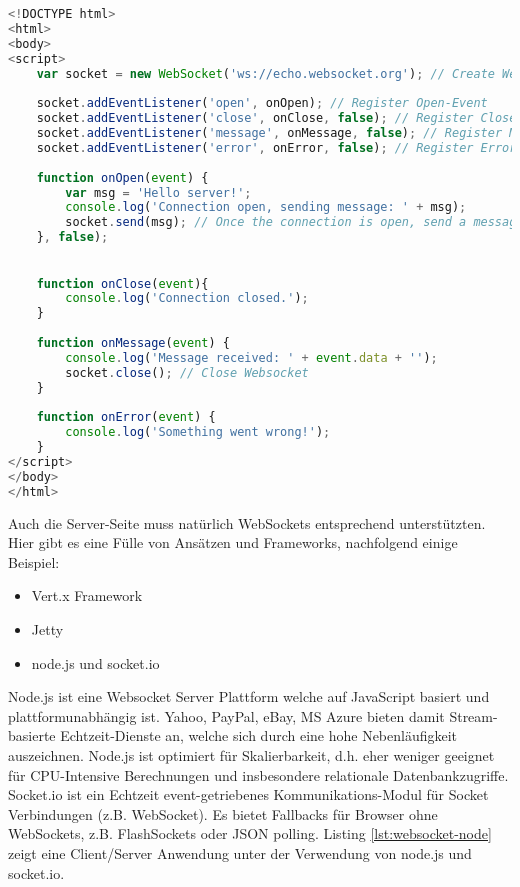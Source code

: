 \begin{lstlisting}[language=Javascript, caption=Websocket Client, label=lst:websocket-client]
<!DOCTYPE html>
<html>
<body>
<script>
	var socket = new WebSocket('ws://echo.websocket.org'); // Create Websocket
	
	socket.addEventListener('open', onOpen); // Register Open-Event
	socket.addEventListener('close', onClose, false); // Register Close-Event
	socket.addEventListener('message', onMessage, false); // Register Message-Event
	socket.addEventListener('error', onError, false); // Register Error-Event
	
	function onOpen(event) {
		var msg = 'Hello server!';
		console.log('Connection open, sending message: ' + msg);
		socket.send(msg); // Once the connection is open, send a message to the server
	}, false);
	

	function onClose(event){
		console.log('Connection closed.');
	}
	
	function onMessage(event) {
		console.log('Message received: ' + event.data + '');
		socket.close(); // Close Websocket
	}
	
	function onError(event) {
		console.log('Something went wrong!');
	}
</script>
</body>
</html>
\end{lstlisting}

Auch die Server-Seite muss natürlich WebSockets entsprechend unterstützten. Hier gibt es eine Fülle von Ansätzen und Frameworks, nachfolgend einige Beispiel:
\begin{itemize}
	\item Vert.x Framework
	\item Jetty
	\item node.js und socket.io
\end{itemize}
Node.js ist eine Websocket Server Plattform welche auf JavaScript basiert und plattformunabhängig ist. Yahoo, PayPal, eBay, MS Azure bieten damit Stream-basierte Echtzeit-Dienste an, welche sich durch eine hohe Nebenläufigkeit auszeichnen. Node.js ist optimiert für Skalierbarkeit, d.h. eher weniger geeignet für CPU-Intensive Berechnungen und insbesondere relationale Datenbankzugriffe. Socket.io ist ein Echtzeit event-getriebenes Kommunikations-Modul für Socket Verbindungen (z.B. WebSocket). Es bietet Fallbacks für Browser ohne WebSockets, z.B. FlashSockets oder JSON polling. Listing \ref{lst:websocket-node} zeigt eine Client/Server Anwendung unter der Verwendung von node.js und socket.io.

